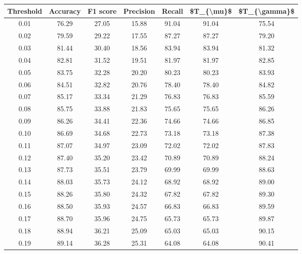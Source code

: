 \begin{tabular}{|c|c|c|c|c|c|c|}
\hline
 Threshold &  Accuracy &  F1 score &  Precision &  Recall &  \$T\_\{\textbackslash mu\}\$ &  \$T\_\{\textbackslash gamma\}\$ \\
\hline
      0.01 &     76.29 &     27.05 &      15.88 &   91.04 &      91.04 &         75.54 \\
      0.02 &     79.59 &     29.22 &      17.55 &   87.27 &      87.27 &         79.20 \\
      0.03 &     81.44 &     30.40 &      18.56 &   83.94 &      83.94 &         81.32 \\
      0.04 &     82.81 &     31.52 &      19.51 &   81.97 &      81.97 &         82.85 \\
      0.05 &     83.75 &     32.28 &      20.20 &   80.23 &      80.23 &         83.93 \\
      0.06 &     84.51 &     32.82 &      20.76 &   78.40 &      78.40 &         84.82 \\
      0.07 &     85.17 &     33.34 &      21.29 &   76.83 &      76.83 &         85.59 \\
      0.08 &     85.75 &     33.88 &      21.83 &   75.65 &      75.65 &         86.26 \\
      0.09 &     86.26 &     34.41 &      22.36 &   74.66 &      74.66 &         86.85 \\
      0.10 &     86.69 &     34.68 &      22.73 &   73.18 &      73.18 &         87.38 \\
      0.11 &     87.07 &     34.97 &      23.09 &   72.02 &      72.02 &         87.83 \\
      0.12 &     87.40 &     35.20 &      23.42 &   70.89 &      70.89 &         88.24 \\
      0.13 &     87.73 &     35.51 &      23.79 &   69.99 &      69.99 &         88.63 \\
      0.14 &     88.03 &     35.73 &      24.12 &   68.92 &      68.92 &         89.00 \\
      0.15 &     88.26 &     35.80 &      24.32 &   67.82 &      67.82 &         89.30 \\
      0.16 &     88.50 &     35.93 &      24.57 &   66.83 &      66.83 &         89.59 \\
      0.17 &     88.70 &     35.96 &      24.75 &   65.73 &      65.73 &         89.87 \\
      0.18 &     88.94 &     36.21 &      25.09 &   65.03 &      65.03 &         90.15 \\
      0.19 &     89.14 &     36.28 &      25.31 &   64.08 &      64.08 &         90.41 \\

\end{tabular}
